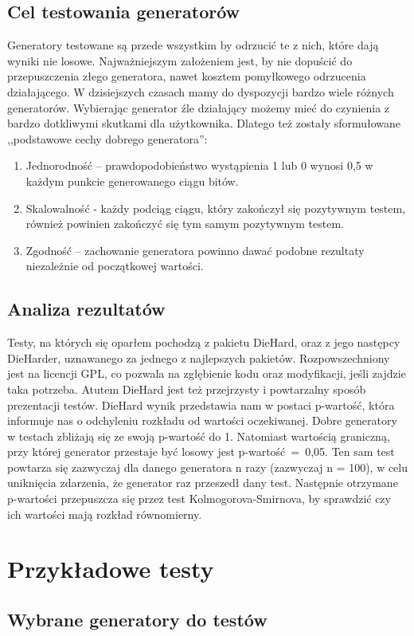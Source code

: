 \documentclass[11pt]{aghdpl}
\begin{document}
\subsection{Cel testowania generatorów}
Generatory testowane są przede wszystkim by odrzucić te z nich, które dają wyniki nie losowe. Najważniejszym założeniem jest, by nie dopuścić do przepuszczenia złego generatora, nawet kosztem pomyłkowego odrzucenia działającego. W dzisiejszych czasach mamy do dyspozycji bardzo wiele różnych generatorów. Wybierając generator źle działający możemy mieć do czynienia z bardzo dotkliwymi skutkami dla użytkownika. Dlatego też zostały sformułowane ,,podstawowe cechy dobrego generatora'':
\begin{enumerate}
\item Jednorodność – prawdopodobieństwo wystąpienia 1 lub 0 wynosi 0,5 w każdym punkcie generowanego ciągu bitów.
\item Skalowalność - każdy podciąg ciągu, który zakończył się pozytywnym testem, również powinien zakończyć się tym samym pozytywnym testem.
\item Zgodność – zachowanie generatora powinno dawać podobne rezultaty niezależnie od początkowej wartości.
\end{enumerate}
\subsection{Analiza rezultatów}
Testy, na których się oparłem pochodzą z pakietu DieHard, oraz z jego następcy DieHarder, uznawanego za jednego z najlepszych pakietów. Rozpowszechniony jest na licencji GPL, co pozwala na zgłębienie kodu oraz modyfikacji, jeśli zajdzie taka potrzeba. Atutem DieHard jest też przejrzysty i powtarzalny sposób prezentacji testów. DieHard wynik przedstawia nam w postaci p-wartość, która informuje nas o odchyleniu rozkładu od wartości oczekiwanej. Dobre generatory w testach zbliżają się ze swoją p-wartość do 1. Natomiast wartością graniczną, przy której generator przestaje być losowy jest p-wartość~=~0,05. 
Ten sam test powtarza się zazwyczaj dla danego generatora n razy (zazwyczaj n = 100), w celu uniknięcia zdarzenia, że generator raz przeszedł dany test. Następnie otrzymane p-wartości przepuszcza się przez test Kolmogorova-Smirnova, by sprawdzić czy ich wartości mają rozkład równomierny.
\section{Przykładowe testy}
\subsection{Wybrane generatory do testów}
\end{document}
